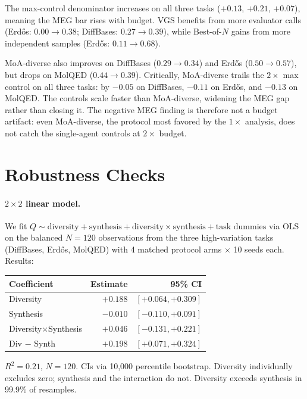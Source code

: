 \documentclass{article}
\begin{document}
The max-control denominator increases on all three tasks ($+0.13$, $+0.21$, $+0.07$), meaning the MEG bar rises with budget. VGS benefits from more evaluator calls (Erd\H{o}s: $0.00 \to 0.38$; DiffBases: $0.27 \to 0.39$), while Best-of-$N$ gains from more independent samples (Erd\H{o}s: $0.11 \to 0.68$).

MoA-diverse also improves on DiffBases ($0.29 \to 0.34$) and Erd\H{o}s ($0.50 \to 0.57$), but drops on MolQED ($0.44 \to 0.39$). Critically, MoA-diverse trails the $2{\times}$ max control on all three tasks: by $-0.05$ on DiffBases, $-0.11$ on Erd\H{o}s, and $-0.13$ on MolQED. The controls scale faster than MoA-diverse, widening the MEG gap rather than closing it. The negative MEG finding is therefore not a budget artifact: even MoA-diverse, the protocol most favored by the $1{\times}$ analysis, does not catch the single-agent controls at $2{\times}$ budget.

\section{Robustness Checks}
\label{app:robustness}

\paragraph{$2{\times}2$ linear model.}
We fit $Q \sim \text{diversity} + \text{synthesis} + \text{diversity}{\times}\text{synthesis} + \text{task dummies}$ via OLS on the balanced $N{=}120$ observations from the three high-variation tasks (DiffBases, Erd\H{o}s, MolQED) with 4 matched protocol arms $\times$ 10 seeds each. Results:

\begin{center}
\small
\begin{tabular}{l r r}
\toprule
Coefficient & Estimate & 95\% CI \\
\midrule
Diversity       & $+0.188$ & $[+0.064, +0.309]$ \\
Synthesis       & $-0.010$ & $[-0.110, +0.091]$ \\
Diversity$\times$Synthesis & $+0.046$ & $[-0.131, +0.221]$ \\
\midrule
Div $-$ Synth   & $+0.198$ & $[+0.071, +0.324]$ \\
\bottomrule
\end{tabular}
\end{center}

\noindent $R^{2}{=}0.21$, $N{=}120$. CIs via 10{,}000 percentile bootstrap. Diversity individually excludes zero; synthesis and the interaction do not. Diversity exceeds synthesis in 99.9\% of resamples.
\end{document}
